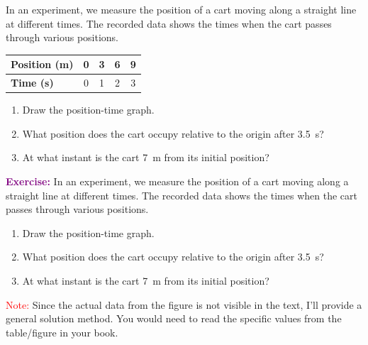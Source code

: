 \begin{exercise}
    In an experiment, we measure the position of a cart moving along a straight line at different times. The recorded data shows the times when the cart passes through various positions.
    \begin{table}[H]
        \centering
        \renewcommand{\arraystretch}{1.5}
        \begin{tabular}{Occcc}
            \bottomrule
            \textcolor{ocre}{\textbf{Position (\unit{\metre})}} & 0 & 3 & 6 & 9 \\
            \hline
            \textcolor{ocre}{\textbf{Time (\unit{\s})}}         & 0 & 1 & 2 & 3 \\
            \toprule
        \end{tabular}
        \label{tab:ejercicio1}
    \end{table}
    \begin{enumerate}[label=\letraminuscula]
    \item Draw the position-time graph.
    \item What position does the cart occupy relative to the origin after \qty{3.5}{\s}?
    \item At what instant is the cart \qty{7}{\m} from its initial position?
    \end{enumerate}

    \begin{solu}
        \textbf{\textcolor{purple}{Exercise:}} In an experiment, we measure the position of a cart moving along a straight line at different times. The recorded data shows the times when the cart passes through various positions.
        \begin{enumerate}[label=\letraminuscula]
            \item Draw the position-time graph.
            \item What position does the cart occupy relative to the origin after \qty{3.5}{\s}?
            \item At what instant is the cart \qty{7}{\m} from its initial position?
        \end{enumerate}

        \vspace{0.3cm}

        \textcolor{red}{Note:} Since the actual data from the figure is not visible in the text, I'll provide a general solution method. You would need to read the specific values from the table/figure in your book.


\end{solu}
\end{exercise}
